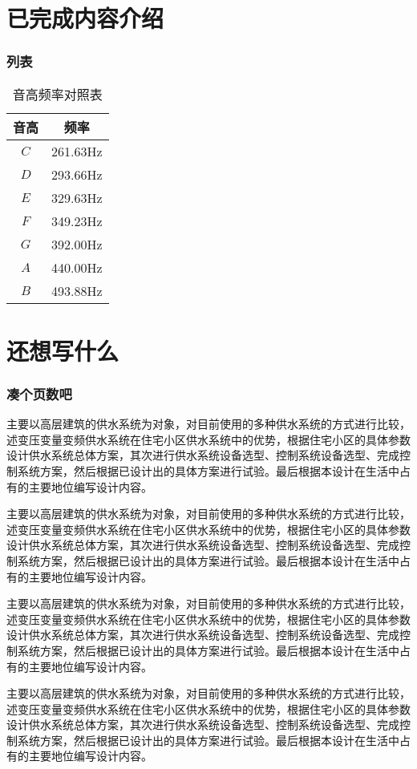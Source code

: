 \documentclass{CUCBeamer}
\begin{document}
\section[介绍]{已完成内容介绍}
    \begin{frame}
        \frametitle{列表}
\begin{table}[]
    \centering
    \caption{音高频率对照表}
    \label{tab:my-table}
    \begin{tabular}{@{}cc@{}}
    \toprule
    音高               & 频率       \\ \midrule
    $C$              & 261.63Hz \\
    $D$              & 293.66Hz \\
    $E$              & 329.63Hz \\
    $F$              & 349.23Hz \\
    $G$              & 392.00Hz \\
    $A$              & 440.00Hz \\
    $B$              & 493.88Hz \\ \bottomrule
    \end{tabular}
    \end{table}

    \end{frame}


\section[什么]{还想写什么}

    \begin{frame}[allowframebreaks]
        \frametitle{凑个页数吧}
        主要以高层建筑的供水系统为对象，对目前使用的多种供水系统的方式进行比较，述变压变量变频供水系统在住宅小区供水系统中的优势，根据住宅小区的具体参数设计供水系统总体方案，其次进行供水系统设备选型、控制系统设备选型、完成控制系统方案，然后根据已设计出的具体方案进行试验。最后根据本设计在生活中占有的主要地位编写设计内容。  
        
        主要以高层建筑的供水系统为对象，对目前使用的多种供水系统的方式进行比较，述变压变量变频供水系统在住宅小区供水系统中的优势，根据住宅小区的具体参数设计供水系统总体方案，其次进行供水系统设备选型、控制系统设备选型、完成控制系统方案，然后根据已设计出的具体方案进行试验。最后根据本设计在生活中占有的主要地位编写设计内容。 

        主要以高层建筑的供水系统为对象，对目前使用的多种供水系统的方式进行比较，述变压变量变频供水系统在住宅小区供水系统中的优势，根据住宅小区的具体参数设计供水系统总体方案，其次进行供水系统设备选型、控制系统设备选型、完成控制系统方案，然后根据已设计出的具体方案进行试验。最后根据本设计在生活中占有的主要地位编写设计内容。 

        主要以高层建筑的供水系统为对象，对目前使用的多种供水系统的方式进行比较，述变压变量变频供水系统在住宅小区供水系统中的优势，根据住宅小区的具体参数设计供水系统总体方案，其次进行供水系统设备选型、控制系统设备选型、完成控制系统方案，然后根据已设计出的具体方案进行试验。最后根据本设计在生活中占有的主要地位编写设计内容。 
        
    \end{frame}
\end{document}
